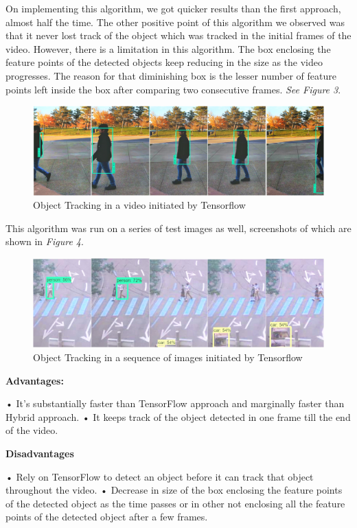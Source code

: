 \documentclass[10pt,twocolumn,letterpaper]{article}
\begin{document}
On implementing this algorithm, we got quicker results than the first approach, almost half the time. The other positive point of this algorithm we observed was that it never lost track of the object which was tracked in the initial frames of the video. However, there is a limitation in this algorithm. The box enclosing the feature points of the detected objects keep reducing in the size as the video progresses. The reason for that diminishing box is the lesser number of feature points left inside the box after comparing two consecutive frames.\textit{ See Figure 3}.

\begin{figure}
\includegraphics[width=\linewidth]{Tracking.jpg}
\caption{Object Tracking in a video initiated by Tensorflow}
\end{figure}

This algorithm was run on a series of test images as well, screenshots of which are shown in \textit{Figure 4}.

\begin{figure}
\includegraphics[width=\linewidth]{Tracking_images.jpg}
\caption{Object Tracking in a sequence of images initiated by Tensorflow}
\end{figure}

\textbf{Advantages:}

•	It’s substantially faster than TensorFlow approach and marginally faster than Hybrid approach.
•	It keeps track of the object detected in one frame till the end of the video.

\textbf{Disadvantages}

•	Rely on TensorFlow to detect an object before it can track that object throughout the video.
•	Decrease in size of the box enclosing the feature points of the detected object as the time passes or in other not enclosing all the feature points of the detected object after a few frames.
 
\end{document}
